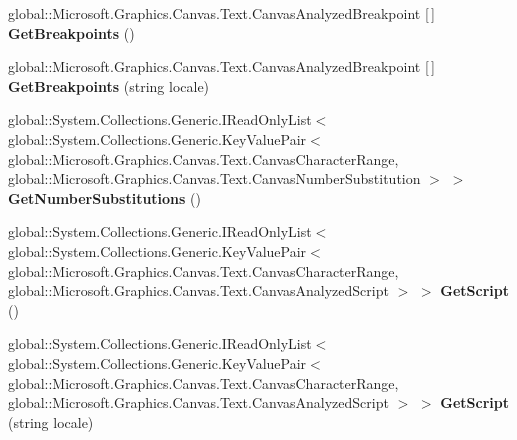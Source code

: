 \begin{DoxyCompactItemize}
global\+::\+Microsoft.\+Graphics.\+Canvas.\+Text.\+Canvas\+Analyzed\+Breakpoint \mbox{[}$\,$\mbox{]} {\bfseries Get\+Breakpoints} ()
\item 
\mbox{\label{class_microsoft_1_1_graphics_1_1_canvas_1_1_text_1_1_canvas_text_analyzer_a7f12634faf61280080d6775ca31df5f7}} 
global\+::\+Microsoft.\+Graphics.\+Canvas.\+Text.\+Canvas\+Analyzed\+Breakpoint \mbox{[}$\,$\mbox{]} {\bfseries Get\+Breakpoints} (string locale)
\item 
\mbox{\label{class_microsoft_1_1_graphics_1_1_canvas_1_1_text_1_1_canvas_text_analyzer_ab7c0ac36c53cf72f84cbb4afc2027819}} 
global\+::\+System.\+Collections.\+Generic.\+I\+Read\+Only\+List$<$ global\+::\+System.\+Collections.\+Generic.\+Key\+Value\+Pair$<$ global\+::\+Microsoft.\+Graphics.\+Canvas.\+Text.\+Canvas\+Character\+Range, global\+::\+Microsoft.\+Graphics.\+Canvas.\+Text.\+Canvas\+Number\+Substitution $>$ $>$ {\bfseries Get\+Number\+Substitutions} ()
\item 
\mbox{\label{class_microsoft_1_1_graphics_1_1_canvas_1_1_text_1_1_canvas_text_analyzer_a5433100913a09da60dd47164a91bfe82}} 
global\+::\+System.\+Collections.\+Generic.\+I\+Read\+Only\+List$<$ global\+::\+System.\+Collections.\+Generic.\+Key\+Value\+Pair$<$ global\+::\+Microsoft.\+Graphics.\+Canvas.\+Text.\+Canvas\+Character\+Range, global\+::\+Microsoft.\+Graphics.\+Canvas.\+Text.\+Canvas\+Analyzed\+Script $>$ $>$ {\bfseries Get\+Script} ()
\item 
\mbox{\label{class_microsoft_1_1_graphics_1_1_canvas_1_1_text_1_1_canvas_text_analyzer_a211990c1225d082a3ab504974c87963b}} 
global\+::\+System.\+Collections.\+Generic.\+I\+Read\+Only\+List$<$ global\+::\+System.\+Collections.\+Generic.\+Key\+Value\+Pair$<$ global\+::\+Microsoft.\+Graphics.\+Canvas.\+Text.\+Canvas\+Character\+Range, global\+::\+Microsoft.\+Graphics.\+Canvas.\+Text.\+Canvas\+Analyzed\+Script $>$ $>$ {\bfseries Get\+Script} (string locale)
\item 
\mbox{\label{class_microsoft_1_1_graphics_1_1_canvas_1_1_text_1_1_canvas_text_analyzer_afbf85c9284d7c890f62052a14192996c}} 

\end{DoxyCompactItemize}
